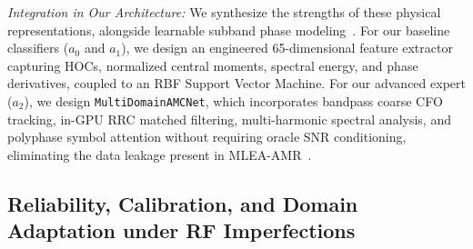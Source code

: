 \emph{Integration in Our Architecture:} We synthesize the strengths of these physical representations, alongside learnable subband phase modeling~\cite{zhang2026cspmnet}. For our baseline classifiers ($a_0$ and $a_1$), we design an engineered 65-dimensional feature extractor capturing HOCs, normalized central moments, spectral energy, and phase derivatives, coupled to an RBF Support Vector Machine. For our advanced expert ($a_2$), we design \texttt{MultiDomainAMCNet}, which incorporates bandpass coarse CFO tracking, in-GPU RRC matched filtering, multi-harmonic spectral analysis, and polyphase symbol attention without requiring oracle SNR conditioning, eliminating the data leakage present in MLEA-AMR~\cite{gao2026mlea}.

\subsection{Reliability, Calibration, and Domain Adaptation under RF Imperfections}
\label{subsec:rel_uq_da}

